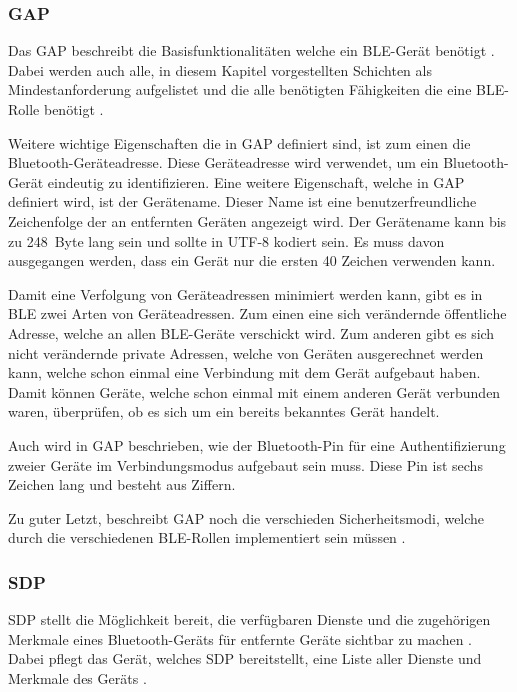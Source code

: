 \subsubsection{\acf{GAP}}
Das \acl{GAP} beschreibt die Basisfunktionalitäten welche ein \ac{BLE}-Gerät benötigt \cite[S.~207]{bluetoothCore}. Dabei werden auch alle, in diesem Kapitel vorgestellten Schichten als Mindestanforderung aufgelistet und die alle benötigten Fähigkeiten die eine \ac{BLE}-Rolle benötigt \cite[S.~277f., S.~1241]{bluetoothCore}. 

Weitere wichtige Eigenschaften die in \ac{GAP} definiert sind, ist zum einen die Bluetooth-Geräteadresse. Diese Geräteadresse wird verwendet, um ein Bluetooth-Gerät eindeutig zu identifizieren. Eine weitere Eigenschaft, welche in \ac{GAP} definiert wird, ist der Gerätename. Dieser Name ist eine benutzerfreundliche Zeichenfolge der an entfernten Geräten angezeigt wird. Der Gerätename kann bis zu 248~Byte lang sein und sollte in UTF-8 kodiert sein. Es muss davon ausgegangen werden, dass ein Gerät nur die ersten 40 Zeichen verwenden kann. \cite[S.~1251ff.]{bluetoothCore}

Damit eine Verfolgung von Geräteadressen minimiert werden kann, gibt es in \ac{BLE} zwei Arten von Geräteadressen. Zum einen eine sich verändernde öffentliche Adresse, welche an allen \ac{BLE}-Geräte verschickt wird. Zum anderen gibt es sich nicht verändernde private Adressen, welche von Geräten ausgerechnet werden kann, welche schon einmal eine Verbindung mit dem Gerät aufgebaut haben. Damit können Geräte, welche schon einmal mit einem anderen Gerät verbunden waren, überprüfen, ob es sich um ein bereits bekanntes Gerät handelt. \cite[S.~18]{siliconBLE}

Auch wird in \ac{GAP} beschrieben, wie der Bluetooth-Pin für eine Authentifizierung zweier Geräte im Verbindungsmodus aufgebaut sein muss. Diese Pin ist sechs Zeichen lang und besteht aus Ziffern. \cite[S.~1253]{bluetoothCore}

Zu guter Letzt, beschreibt \ac{GAP} noch die verschieden Sicherheitsmodi, welche durch die verschiedenen \ac{BLE}-Rollen implementiert sein müssen \cite[S.~1337]{bluetoothCore}.

\subsubsection{\acf{SDP}}
\ac{SDP} stellt die Möglichkeit bereit, die verfügbaren Dienste und die zugehörigen Merkmale eines Bluetooth-Geräts für entfernte Geräte sichtbar zu machen \cite[S.~1173]{bluetoothCore}. Dabei pflegt das Gerät, welches \ac{SDP} bereitstellt, eine Liste aller Dienste und Merkmale des Geräts \cite[S.~1177]{bluetoothCore}.


